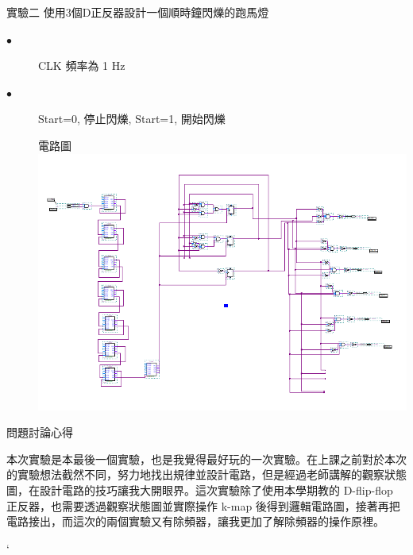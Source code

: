 \documentclass[12pt, a4paper]{article}
\begin{document}
\begin{description}
\begin{description}
          \fontsize{20pt}{22pt}\selectfont
          \item 實驗二 \space 使用3個D正反器設計一個順時鐘閃爍的跑馬燈 \\
            \fontsize{16pt}{18pt}\selectfont
              \begin{description}
                \item [$\bullet$] CLK 頻率為 1 Hz
                \item [$\bullet$] Start=0, 停止閃爍, Start=1, 開始閃爍
                \fontsize{18pt}{20pt}
                  \item []電路圖 \\[.3cm]
                    \includegraphics[width=13cm]{./image/ex2.png}
              \end{description}
            \normalsize
        \normalsize
      \end{description}
    \item [三]問題討論心得 \\[.6cm]
      \begin{minipage}[t]{\linewidth}
        \fontsize{16}{18}\selectfont
        本次實驗是本最後一個實驗，也是我覺得最好玩的一次實驗。在上課之前對於本次的實驗想法截然不同，努力地找出規律並設計電路，但是經過老師講解的觀察狀態圖，在設計電路的技巧讓我大開眼界。這次實驗除了使用本學期教的 D-flip-flop 正反器，也需要透過觀察狀態圖並實際操作 k-map 後得到邏輯電路圖，接著再把電路接出，而這次的兩個實驗又有除頻器，讓我更加了解除頻器的操作原裡。 
      \end{minipage}
  \normalsize
\end{description}`
\end{document}
